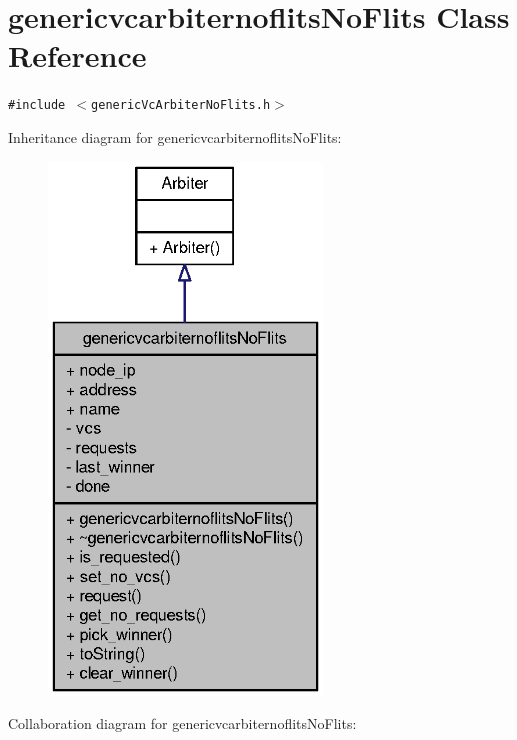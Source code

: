 \section{genericvcarbiternoflitsNoFlits Class Reference}
\label{classgenericvcarbiternoflitsNoFlits}
{\tt \#include $<$genericVcArbiterNoFlits.h$>$}

Inheritance diagram for genericvcarbiternoflitsNoFlits:\nopagebreak
\begin{figure}[H]
\begin{center}
\leavevmode
\includegraphics[width=206pt]{classgenericvcarbiternoflitsNoFlits__inherit__graph}
\end{center}
\end{figure}
Collaboration diagram for genericvcarbiternoflitsNoFlits:\nopagebreak
